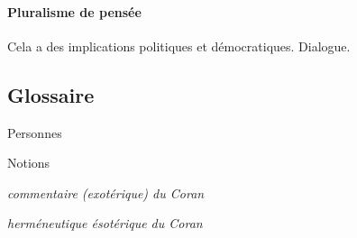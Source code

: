 \paragraph{Pluralisme de pensée}
Cela a des implications politiques et démocratiques. Dialogue.

\subsection{Glossaire}

 
{Personnes}



{Notions}
\begin{Def}[tafsir]
\emph{commentaire (exotérique) du Coran}
\end{Def}


\begin{Def}[ta'wil]
\emph{herméneutique ésotérique du Coran}
\end{Def}
 
